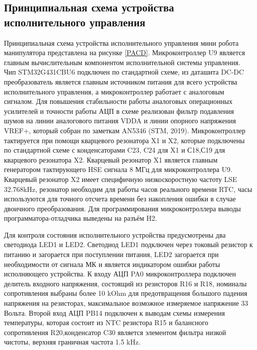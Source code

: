 

\subsection{Принципиальная схема устройства исполнительного управления }

Принципиальная схема устройства исполнительного управления мини робота манипулятора представлена на рисунке \ref{PACD}. Микроконтроллер U9 является главным вычислительным компонентом исполнительной системы управления. Чип STM32G431CBU6 подключен по стандартной схеме, из даташита \citep{STM32G431}DC-DC преобразователь является главным источником питания для всего устройства исполнительного управления, а микроконтроллер работает с аналоговым сигналом. Для повышения стабильности работы аналоговых операционных усилителей и точности работы АЦП  в схеме реализован фильтр подавления шумов на линии аналогового питания VDDA и линии опорного напряжения VREF+, который собран по заметкам AN5346 (STM, 2019). Микроконтроллер тактируется при помощи кварцевого резонатора X1 и X2, которые подключены по стандартной схеме с конденсаторами C23, C24 для X1 и С18,С19 для кварцевого резонатора X2. Кварцевый резонатор X1 является  главным генератором тактирующего HSE сигнала 8 МГц для микроконтроллера U9. Кварцевый резонатор X2 имеет специфичную  низкоскоростную частоту LSE 32.768kHz, резонатор необходим для работы часов реального времени RTC, часы используются для точного отсчета времени без накопления ошибки в случае двоичного преобразования. Для программирования микроконтроллера выводы программатора-отладчика выведены на разъём H2.

Для контроля состояния исполнительного устройства предусмотрены два светодиода LED1 и LED2. Светодиод LED1 подключен через токовый резистор к питанию и загорается при поступлении питания, LED2 загорается при необходимости от сигнала МК и является индикатором ошибки работы исполняющего устройства.  К входу АЦП PA0 микроконтроллера подключен делитель входного напряжения, состоящий из резисторов R16 и R18, номиналы сопротивления выбраны более 10 kOhm для предотвращения большого падения напряжения на резисторах, максимальное возможное измеряемое напряжение 33 Вольта. Второй вход АЦП PB14 подключен к выводам схемы измерения температуры, которая состоит из NTC резистора R15 и балансного сопротивления R20,конденсатор C30 является элементом фильтра низкой чистоты, верхняя граничная частота  1.5 kHz.

